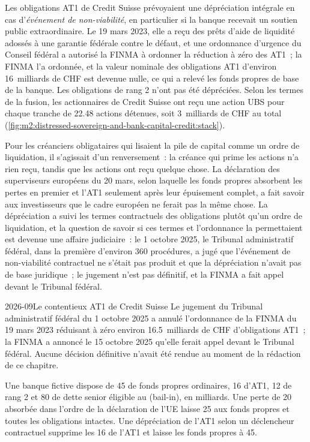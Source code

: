 Les obligations AT1 de Credit Suisse prévoyaient une dépréciation intégrale
en cas d'\emph{événement de non-viabilité}, en particulier si la banque recevait un soutien public
extraordinaire. Le 19 mars 2023, elle a reçu des prêts d'aide de liquidité adossés à une garantie fédérale
contre le défaut, et une ordonnance d'urgence du Conseil fédéral a autorisé la FINMA à ordonner la réduction à zéro
des AT1~; la FINMA l'a ordonnée, et la valeur nominale des obligations AT1
d'environ 16~milliards de CHF est devenue nulle, ce qui a relevé les fonds propres de base de la banque. Les obligations de rang 2 n'ont pas
été dépréciées. Selon les termes de la fusion, les actionnaires de Credit Suisse ont reçu une action UBS
pour chaque tranche de 22.48 actions détenues, soit 3~milliards de CHF au total
(\cref{fig:m2:distressed-sovereign-and-bank-capital-credit:stack}).

Pour les créanciers obligataires qui lisaient la pile de capital comme un ordre de liquidation, il s'agissait d'un renversement~:
la créance qui prime les actions n'a rien reçu, tandis que les actions ont reçu quelque chose. La
déclaration des superviseurs européens du 20 mars, selon laquelle les fonds propres absorbent les pertes en premier et l'AT1
seulement après leur épuisement complet, a fait savoir aux investisseurs que le cadre européen ne ferait pas la
même chose. La dépréciation a suivi les termes contractuels des obligations plutôt qu'un ordre de
liquidation, et la question de savoir si ces termes et l'ordonnance la permettaient est devenue une affaire
judiciaire~: le 1 octobre 2025, le Tribunal administratif fédéral, dans la première d'environ 360
procédures, a jugé que l'événement de non-viabilité contractuel ne s'était pas produit et que la
dépréciation n'avait pas de base juridique~; le jugement n'est pas définitif, et la FINMA a fait appel devant le
Tribunal fédéral.

\begin{dated}{2026-09}{Le contentieux AT1 de Credit Suisse}\label{dat:m2:distressed-sovereign-and-bank-capital-credit:at1}
Le jugement du Tribunal administratif fédéral du 1 octobre 2025 a annulé l'ordonnance de la FINMA
du 19 mars 2023 réduisant à zéro environ 16.5~milliards de CHF d'obligations AT1~; la FINMA a annoncé le
15 octobre 2025 qu'elle ferait appel devant le Tribunal fédéral. Aucune décision définitive n'avait été
rendue au moment de la rédaction de ce chapitre.
\end{dated}

\begin{example}\label{ex:m2:distressed-sovereign-and-bank-capital-credit:stack}
Une banque fictive dispose de 45 de fonds propres ordinaires, 16 d'AT1, 12 de rang 2 et 80 de dette senior
éligible au  (bail-in), en milliards. Une perte de 20 absorbée dans l'ordre
de la déclaration de l'UE laisse 25 aux fonds propres et toutes les obligations intactes. Une dépréciation de l'AT1 selon un
déclencheur contractuel supprime les 16 de l'AT1 et laisse les fonds propres à 45.
\end{example}

